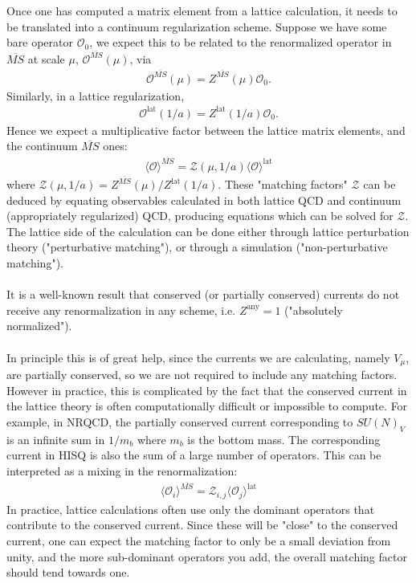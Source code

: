Once one has computed a matrix element from a lattice calculation, it needs to be translated into a continuum regularization scheme. Suppose we have some bare operator $\mathcal{O}_0$, we expect this to be related to the renormalized operator in $\overline{MS}$ at scale $\mu$, $\mathcal{O}^{\overline{MS}}(\mu)$, via
\begin{align}
	\mathcal{O}^{\overline{MS}}(\mu) = Z^{\overline{MS}}(\mu) \mathcal{O}_0.
\end{align}
Similarly, in a lattice regularization,
\begin{align}
	\mathcal{O}^{\text{lat}}(1/a) = Z^{\text{lat}}(1/a) \mathcal{O}_0.
\end{align}
Hence we expect a multiplicative factor between the lattice matrix elements, and the continuum $\overline{MS}$ ones:
\begin{align}
	\langle \mathcal{O} \rangle^{\overline{MS}} = \mathcal{Z}(\mu,1/a) \langle \mathcal{O} \rangle^{\text{lat}}
\end{align}
where $\mathcal{Z}(\mu,1/a) = Z^{\overline{MS}}(\mu)/Z^{\text{lat}}(1/a)$. These "matching factors" $\mathcal{Z}$ can be deduced by equating observables calculated in both lattice QCD and continuum (appropriately regularized) QCD, producing equations which can be solved for $\mathcal{Z}$. The lattice side of the calculation can be done either through lattice perturbation theory ("perturbative matching"), or through a simulation ("non-perturbative matching").
\\ \\
It is a well-known result that conserved (or partially conserved) currents do not receive any renormalization in any scheme, i.e. $Z^{\text{any}}=1$ ("absolutely normalized").
\\ \\
In principle this is of great help, since the currents we are calculating, namely $V_{\mu}$, are partially conserved, so we are not required to include any matching factors. However in practice, this is complicated by the fact that the conserved current in the lattice theory is often computationally difficult or impossible to compute. For example, in NRQCD, the partially conserved current corresponding to $SU(N)_V$ is an infinite sum in $1/m_b$ where $m_b$ is the bottom mass. The corresponding current in HISQ is also the sum of a large number of operators. This can be interpreted as a mixing in the renormalization:
\begin{align}
	\langle \mathcal{O}_i \rangle^{\overline{MS}} = \mathcal{Z}_{i,j} \langle \mathcal{O}_j \rangle^{\text{lat}}
\end{align}
In practice, lattice calculations often use only the dominant operators that contribute to the conserved current. Since these will be "close" to the conserved current, one can expect the matching factor to only be a small deviation from unity, and the more sub-dominant operators you add, the overall matching factor should tend towards one.

